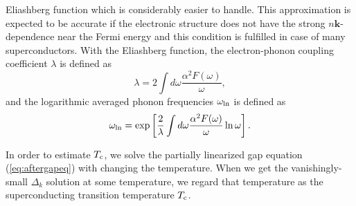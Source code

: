 Eliashberg function which is considerably easier to handle.
This approximation is expected to be accurate if the electronic structure does not have the
strong $n\bm k$-dependence near the Fermi energy and this condition is fulfilled in case of 
many superconductors.
With the Eliashberg function, the electron-phonon coupling coefficient $\lambda$ is defined as
%
\begin{equation}
	\lambda = 2\int d\omega \frac{\alpha^2F(\omega)}{\omega},
	\label{eq:elphlambda}
\end{equation}
%
and the logarithmic averaged phonon frequencies $\omega_{\rm ln}$ is defined as
%
\begin{equation}
	\omega_{\rm ln} = \exp\left[ \frac{2}{\lambda}\int d\omega \frac{\alpha^2F(\omega)}{\omega}\ln \omega \right].
	\label{eq:omegaln}
\end{equation}
%

In order to estimate $T_{\rm c}$, we solve the partially linearized gap equation (\ref{eq:aftergapeq}) with changing 
the temperature. When we get the vanishingly-small $\Delta_{k}$ solution at some temperature, 
we regard that temperature as the superconducting transition temperature $T_{\rm c}$.
%
%

